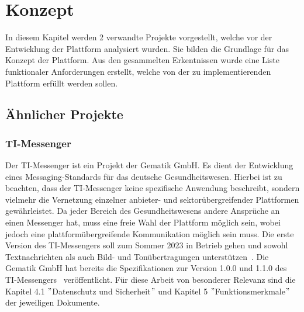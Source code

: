     \chapter{Konzept}\label{ch:konzept}
    In diesem Kapitel werden 2 verwandte Projekte vorgestellt, welche vor der Entwicklung der Plattform analysiert wurden.
    Sie bilden die Grundlage für das Konzept der Plattform.
    Aus den gesammelten Erkentnissen wurde eine Liste funktionaler Anforderungen erstellt, welche von der zu implementierenden Plattform erfüllt werden sollen.

    \section{Ähnlicher Projekte}\label{sec:analyse-ahnlicher-projekte}

    \subsection{TI-Messenger}\label{subsec:ti-messenger}
    Der TI-Messenger ist ein Projekt der Gematik GmbH.
    Es dient der Entwicklung eines Messaging-Standards für das deutsche Gesundheitswesen.
    Hierbei ist zu beachten, dass der TI-Messenger keine spezifische Anwendung beschreibt, sondern vielmehr die Vernetzung einzelner anbieter- und sektorübergreifender Plattformen gewährleistet.
    Da jeder Bereich des Gesundheitswesens andere Ansprüche an einen Messenger hat, muss eine freie Wahl der Plattform möglich sein, wobei jedoch eine plattformübergreifende Kommunikation möglich sein muss.
    Die erste Version des TI-Messengers soll zum Sommer 2023 in Betrieb gehen und sowohl Textnachrichten als auch Bild- und Tonübertragungen unterstützen~\cite{timessenger,timessenger2}.
    Die Gematik GmbH hat bereits die Spezifikationen zur Version 1.0.0 und 1.1.0 des TI-Messengers~\cite{timessenger3} veröffentlicht.
    Für diese Arbeit von besonderer Relevanz sind die Kapitel 4.1 \("\)Datenschutz und Sicherheit\("\) und Kapitel 5 \("\)Funktionsmerkmale\("\) der jeweiligen Dokumente.

